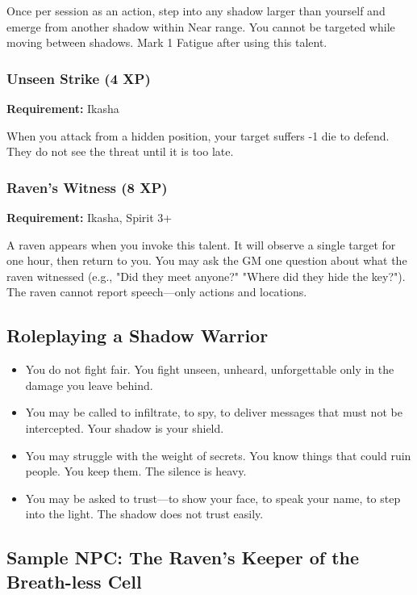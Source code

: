 Once per session as an action, step into any shadow larger than yourself and emerge from another shadow within Near range. You cannot be targeted while moving between shadows. Mark 1 Fatigue after using this talent.

\subsubsection{Unseen Strike (4 XP)}

\textbf{Requirement:} Ikasha

When you attack from a hidden position, your target suffers -1 die to defend. They do not see the threat until it is too late.

\subsubsection{Raven's Witness (8 XP)}

\textbf{Requirement:} Ikasha, Spirit 3+

A raven appears when you invoke this talent. It will observe a single target for one hour, then return to you. You may ask the GM one question about what the raven witnessed (e.g., "Did they meet anyone?" "Where did they hide the key?"). The raven cannot report speech—only actions and locations.

\subsection{Roleplaying a Shadow Warrior}

\begin{itemize}
\item You do not fight fair. You fight unseen, unheard, unforgettable only in the damage you leave behind.
\item You may be called to infiltrate, to spy, to deliver messages that must not be intercepted. Your shadow is your shield.
\item You may struggle with the weight of secrets. You know things that could ruin people. You keep them. The silence is heavy.
\item You may be asked to trust—to show your face, to speak your name, to step into the light. The shadow does not trust easily.
\end{itemize}

\subsection{Sample NPC: The Raven's Keeper of the Breath-less Cell}

